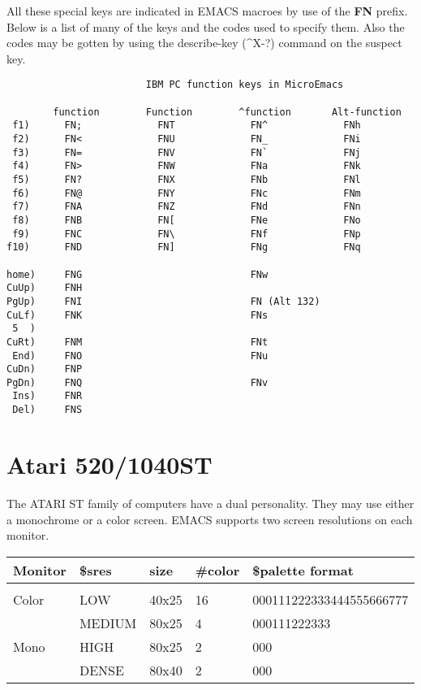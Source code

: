 All these special keys are indicated in EMACS macroes by use of
the {\bf{}FN} prefix.  Below is a list of many of the keys and the codes
used to specify them.  Also the codes may be gotten by using the
describe-key (\^{}X-?) command on the suspect key.

\newpage
\begin{verbatim}
                        IBM PC function keys in MicroEmacs

        function        Function        ^function       Alt-function
 f1)      FN;             FNT             FN^             FNh
 f2)      FN<             FNU             FN_             FNi
 f3)      FN=             FNV             FN`             FNj
 f4)      FN>             FNW             FNa             FNk
 f5)      FN?             FNX             FNb             FNl
 f6)      FN@             FNY             FNc             FNm
 f7)      FNA             FNZ             FNd             FNn
 f8)      FNB             FN[             FNe             FNo
 f9)      FNC             FN\             FNf             FNp
f10)      FND             FN]             FNg             FNq

home)     FNG                             FNw
CuUp)     FNH
PgUp)     FNI                             FN (Alt 132)
CuLf)     FNK                             FNs
 5  )
CuRt)     FNM                             FNt
 End)     FNO                             FNu
CuDn)     FNP
PgDn)     FNQ                             FNv
 Ins)     FNR
 Del)     FNS
\end{verbatim}
\section{Atari 520/1040ST}

The ATARI ST family of computers have a dual personality.  They
may use either a monochrome or a color screen.  EMACS supports two
screen resolutions on each monitor.

\begin{tabular}{lllll}
Monitor & \$sres & size & \#color & \$palette format\\ \hline\\
Color & LOW & 40x25 & 16 & 000111222333444555666777\\
 & MEDIUM & 80x25 & 4 & 000111222333\\
Mono & HIGH & 80x25 & 2 & 000\\
 & DENSE & 80x40 & 2 & 000\\
\end{tabular}

